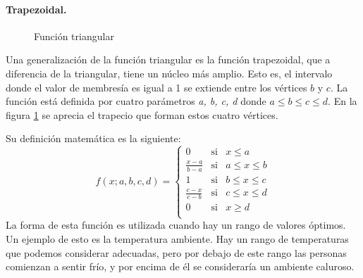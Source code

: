 \paragraph{Trapezoidal.}
\begin{figure}
	\vspace{-\baselineskip}
	\captionsetup{margin=0.2cm,justification=centering}	
	\caption{Función triangular}
	\label{fig:trapmf}
\end{figure}

Una generalización de la función triangular es la función trapezoidal, que a diferencia de la triangular, tiene un núcleo más amplio. Esto es, el intervalo donde el valor de membresía es igual a 1 se extiende entre los vértices
$b$ y $c$.
La función está definida por cuatro parámetros \textit{a, b, c, d} donde $ a \leq b \leq c \leq  d$. En la figura \ref{fig:trapmf} se aprecia el trapecio que forman estos cuatro vértices.

Su definición matemática es la siguiente:
$$  f(x;a,b,c,d)= \left\lbrace \begin{array}{lcl}
						0		& \mbox{si} & x  \leq a \\ [.30cm]
{\displaystyle \frac{x-a}{b-a}} & \mbox{si} & a \leq x \leq b \\ [.45cm]
						1		& \mbox{si} & b \leq x \leq c \\ [.30cm]
{\displaystyle \frac{c-x}{c-b}} & \mbox{si} & c \leq x \leq d \\ [.45cm]
						0 		& \mbox{si} & x \geq d \\
\end{array}
\right.
$$
La forma de esta función es utilizada cuando hay un rango de valores óptimos. Un ejemplo de esto es la temperatura ambiente. Hay un rango de temperaturas que podemos considerar adecuadas, pero por debajo de este rango las personas comienzan a sentir frío, y por encima de él se consideraría un ambiente caluroso.

